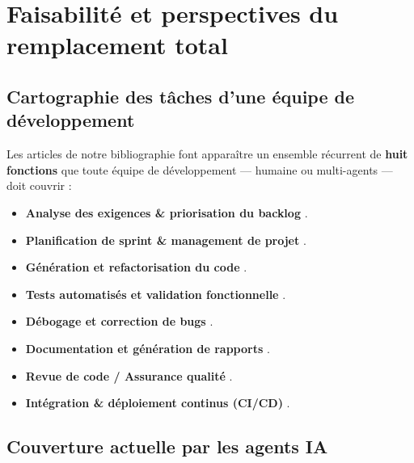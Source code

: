 \chapter{Faisabilité et perspectives du remplacement total} \label{chapitre:faisabilite}

\section{Cartographie des tâches d’une équipe de développement}

Les articles de notre bibliographie font apparaître un ensemble récurrent de \textbf{huit fonctions} que toute équipe de développement — humaine ou multi-agents — doit couvrir :

\begin{itemize}
  \item \textbf{Analyse des exigences \& priorisation du backlog} \parencite{ashraf_autonomous_2025, abbas_ai-driven_2024}.
  \item \textbf{Planification de sprint \& management de projet} \parencite{khan_ai-driven_2025}.
  \item \textbf{Génération et refactorisation du code} \parencite{rasheed_codepori_2024, zahid_multi-agent_2024}.
  \item \textbf{Tests automatisés et validation fonctionnelle} \parencite{rasheed_codepori_2024, khan_ai-driven_2025}.
  \item \textbf{Débogage et correction de bugs} \parencite{ashraf_autonomous_2025, vallecillos_ruiz_agent-driven_2024}.
  \item \textbf{Documentation et génération de rapports} \parencite{ashraf_autonomous_2025, zahid_multi-agent_2024}.
  \item \textbf{Revue de code / Assurance qualité} \parencite{rasheed_codepori_2024, abbas_ai-driven_2024}.
  \item \textbf{Intégration \& déploiement continus (CI/CD)} \parencite{khan_ai-driven_2025}.
\end{itemize}


\section{Couverture actuelle par les agents IA}

